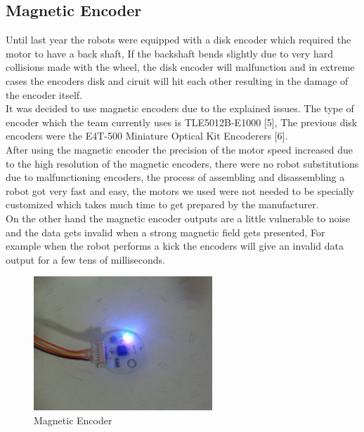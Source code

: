 \subsection{Magnetic Encoder}
Until last year the robots were equipped with a disk encoder which required the motor to have a back shaft, If the backshaft bends slightly due to very hard collisions made with the wheel, the disk encoder will malfunction and in extreme cases the encoders disk and ciruit will hit each other resulting in the damage of the encoder itself.\\
\indent It was decided to use magnetic encoders due to the explained issues. The type of encoder which the team currently uses is TLE5012B-E1000 [5], The previous disk encoders were the E4T-500 Miniature Optical Kit Encoderers [6].\\
\indent After using the magnetic encoder the precision of the motor speed increased due to the high resolution of the magnetic encoders, there were no robot substitutions due to malfunctioning encoders, the process of assembling and disassembling a robot got very fast and easy, the motors we used were not needed to be specially customized which takes much time to get prepared by the manufacturer.\\
\indent On the other hand the magnetic encoder outputs are a little vulnerable to noise and the data gets invalid when a strong magnetic field gets presented, For example when the robot performs a kick the encoders will give an invalid data output for a few tens of milliseconds.\\




\begin{figure}
	\centering
	\includegraphics[width=0.6\textwidth]{images/MAG_ENC.jpg}
	\caption{Magnetic Encoder}
	\label{fig:MAG_ENC}
\end{figure}\\


